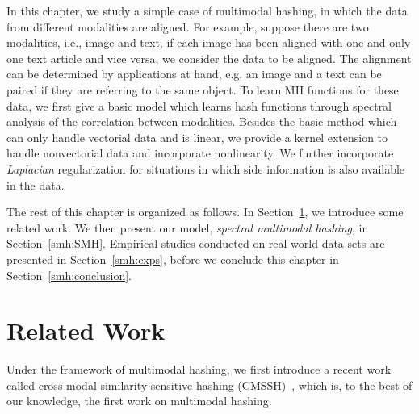 In this chapter, we study a simple case of multimodal hashing, in which the data from different modalities are aligned. For example, suppose there are two modalities, i.e., image and text, if each image has been aligned with one and only one text article and vice versa, we consider the data to be aligned. The alignment can be determined by applications at hand, e.g, an image and a text can be paired if they are referring to the same object. To learn \mbox{MH} functions for these data, we first give a basic model which learns hash functions through spectral analysis of the correlation between modalities. Besides the basic method which can only handle vectorial data and is linear, we provide a kernel extension to handle nonvectorial data and incorporate nonlinearity. We further incorporate \textit{Laplacian} regularization for situations in which side information is also available in the data.



The rest of this chapter is organized as follows. In Section~\ref{smh:relatedwork}, we introduce some related work. We then present our model, \textit{spectral multimodal hashing}, in Section~\ref{smh:SMH}. Empirical studies conducted on real-world data sets are presented in Section~\ref{smh:exps}, before we conclude this chapter in Section~\ref{smh:conclusion}.

\section{Related Work}
\label{smh:relatedwork}



Under the framework of multimodal hashing, we first introduce a recent work called cross modal similarity sensitive hashing (\mbox{CMSSH})~\cite{bronstein2010cvpr}, which is, to the best of our knowledge, the first work on multimodal hashing. 


